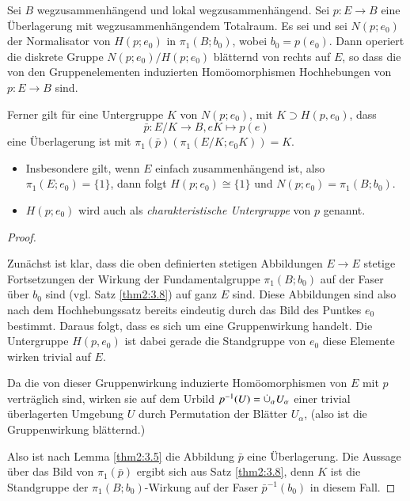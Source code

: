 \documentclass[a4paper,10pt]{scrartcl}
\begin{document}
\begin{st}\label{thm2:3.14}
 Sei $B$ wegzusammenhängend und lokal wegzusammenhängend. Sei $p:E\to B$ eine Überlagerung mit wegzusammenhängendem Totalraum. Es sei  und sei $N(p;e_0)$ der Normalisator von $H(p;e_0)$ in $\pi_1(B;b_0) $, wobei $b_0=p(e_0)$. 
Dann operiert die diskrete Gruppe $N(p;e_0)/H(p;e_0)$ blätternd von rechts auf $E$, so dass die von den Gruppenelementen induzierten Homöomorphismen Hochhebungen von $p:E\to B$ sind.

Ferner gilt für eine Untergruppe $K$ von $N(p;e_0)$, mit $K\supset H(p,e_0)$, dass
\[
 \bar p: E/K \to B, eK\mapsto p(e) 
\]
 eine Überlagerung ist mit $\pi_1(\bar p)(\pi_1(E/K; e_0 K))=K$.
\begin{figure}[H]
\centering
 \fixme[fig92]
\caption{}
\end{figure}
\end{st}
\begin{note*}
\begin{itemize}
\item Insbesondere gilt, wenn $E$ einfach zusammenhängend ist, also $\pi_1(E;e_0)=\{1\}$, dann folgt $H(p;e_0)\cong \{1\}$ und $N(p;e_0)=\pi_1(B;b_0)$.
\item $H(p;e_0)$ wird auch als \emph{charakteristische Untergruppe} von $p$ genannt.
\end{itemize}
\end{note*}
\begin{proof}
\begin{figure}[H]
\centering
 \fixme[fig93]
\caption{}
\end{figure}
 Zunächst ist klar, dass die oben definierten stetigen Abbildungen $E\to E$ stetige Fortsetzungen der Wirkung der 
Fundamentalgruppe $\pi_1(B;b_0)$ auf der Faser über $b_0$ sind (vgl. Satz \ref{thm2:3.8}) auf ganz $E$ sind.  Diese 
Abbildungen sind also nach dem Hochhebungssatz bereits eindeutig durch das Bild des Puntkes $e_0$ bestimmt. 
Daraus folgt, dass es sich um eine Gruppenwirkung handelt. Die Untergruppe $H(p, e_0)$ ist dabei 
gerade die Standgruppe von $e_0$ diese Elemente wirken trivial auf $E$.

Da die von dieser Gruppenwirkung induzierte Homöomorphismen von $E$ mit $p$ verträglich sind, wirken sie auf dem Urbild $p^{-1}(U)=\mathbin{\dot{\cup}}_{\alpha} U_\alpha$ einer trivial überlagerten Umgebung $U$ durch Permutation der Blätter $U_\alpha$, (also ist die Gruppenwirkung blätternd.)
\begin{figure}[H]
\centering
 \fixme[fig94]
\caption{}
\end{figure}
Also ist nach Lemma \ref{thm2:3.5} die Abbildung $\bar{p}$ eine Überlagerung. Die Aussage über das Bild von $\pi_1(\bar p)$ ergibt sich aus Satz \ref{thm2:3.8}, denn $K$ ist die Standgruppe der $\pi_1(B;b_0)$-Wirkung auf der Faser $\bar p^{-1}(b_0)$ in diesem Fall.
\end{proof}
\end{document}
